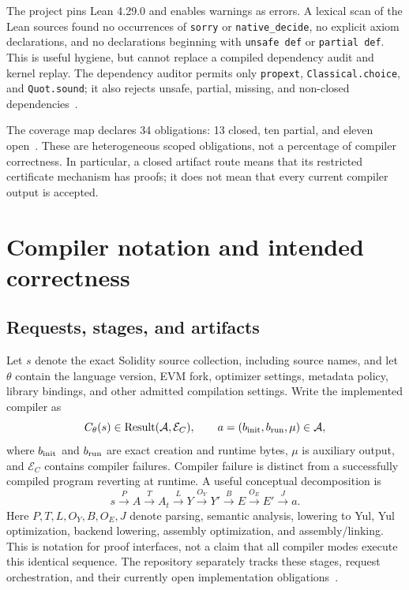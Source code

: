 \documentclass[conference]{IEEEtran}
\begin{document}
The project pins Lean 4.29.0 and enables warnings as errors. A lexical scan of
the Lean sources found no occurrences of \texttt{sorry} or
\texttt{native\_decide}, no explicit axiom declarations, and no declarations
beginning with \texttt{unsafe def} or \texttt{partial def}. This is useful
hygiene, but cannot replace a compiled dependency audit and kernel replay.
The dependency auditor permits only \texttt{propext},
\texttt{Classical.choice}, and \texttt{Quot.sound}; it also rejects unsafe,
partial, missing, and non-closed dependencies~\cite{audit}.

The coverage map declares 34 obligations: 13 closed, ten partial, and eleven
open~\cite{map}. These are heterogeneous scoped obligations, not a percentage
of compiler correctness. In particular, a closed artifact route means that
its restricted certificate mechanism has proofs; it does not mean that every
current compiler output is accepted.

\section{Compiler notation and intended correctness}
\subsection{Requests, stages, and artifacts}
Let $s$ denote the exact Solidity source collection, including source names,
and let $\theta$ contain the language version, EVM fork, optimizer settings,
metadata policy, library bindings, and other admitted compilation settings.
Write the implemented compiler as
\[
 C_\theta(s)\in\operatorname{Result}(\mathcal A,\mathcal E_C),
 \qquad a=(b_{\rm init},b_{\rm run},\mu)\in\mathcal A,
\]
where $b_{\rm init}$ and $b_{\rm run}$ are exact creation and runtime bytes,
$\mu$ is auxiliary output, and $\mathcal E_C$ contains compiler failures.
Compiler failure is distinct from a successfully compiled program reverting
at runtime. A useful conceptual decomposition is
\[
 s\xrightarrow{P}A\xrightarrow{T}A_t\xrightarrow{L}Y
 \xrightarrow{O_Y}Y'\xrightarrow{B}E
 \xrightarrow{O_E}E'\xrightarrow{J}a.
\]
Here $P,T,L,O_Y,B,O_E,J$ denote parsing, semantic analysis, lowering to Yul,
Yul optimization, backend lowering, assembly optimization, and
assembly/linking. This is notation for proof interfaces, not a claim that all
compiler modes execute this identical sequence. The repository separately
tracks these stages, request orchestration, and their currently open
implementation obligations~\cite{map}.
\end{document}
